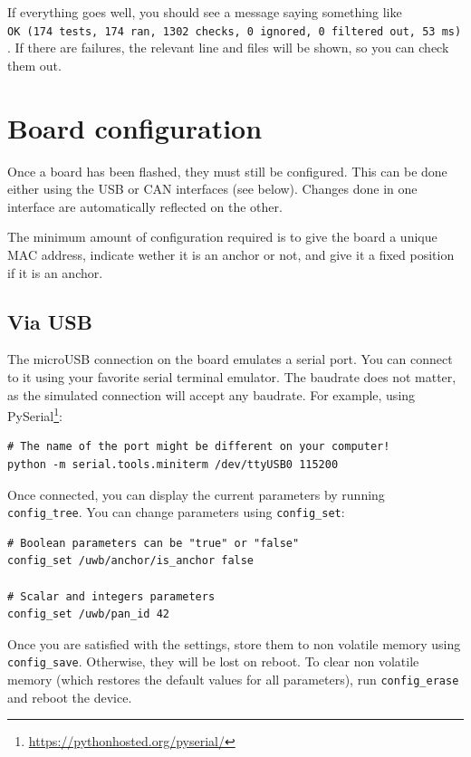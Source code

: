 If everything goes well, you should see a message saying something like
\texttt{OK\ (174\ tests,\ 174\ ran,\ 1302\ checks,\ 0\ ignored,\ 0\ filtered\ out,\ 53\ ms)}.
If there are failures, the relevant line and files will be shown, so you
can check them out.

\section{Board configuration}\label{board-configuration}

Once a board has been flashed, they must still be configured. This can
be done either using the USB or CAN interfaces (see below). Changes done
in one interface are automatically reflected on the other.

The minimum amount of configuration required is to give the board a
unique MAC address, indicate wether it is an anchor or not, and give it
a fixed position if it is an anchor.

\subsection{Via USB}\label{via-usb}

The microUSB connection on the board emulates a serial port. You can
connect to it using your favorite serial terminal emulator. The baudrate
does not matter, as the simulated connection will accept any baudrate.
For example, using PySerial\footnote{\url{https://pythonhosted.org/pyserial/}}:

\begin{verbatim}
# The name of the port might be different on your computer!
python -m serial.tools.miniterm /dev/ttyUSB0 115200
\end{verbatim}

Once connected, you can display the current parameters by running
\texttt{config\_tree}. You can change parameters using
\texttt{config\_set}:

\begin{verbatim}
# Boolean parameters can be "true" or "false"
config_set /uwb/anchor/is_anchor false

# Scalar and integers parameters
config_set /uwb/pan_id 42
\end{verbatim}

Once you are satisfied with the settings, store them to non volatile
memory using \texttt{config\_save}. Otherwise, they will be lost on
reboot. To clear non volatile memory (which restores the default values
for all parameters), run \texttt{config\_erase} and reboot the device.

